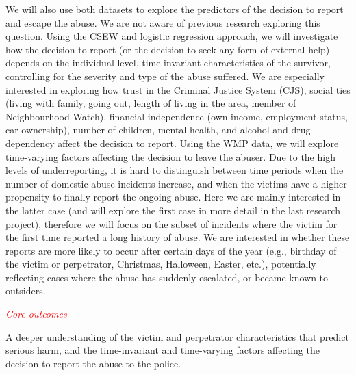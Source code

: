 \documentclass[11pt, a4paper]{article}
\begin{document}
We will also use both datasets to explore the predictors of the decision to report and escape the abuse. We are not aware of previous research exploring this question. Using the CSEW and logistic regression approach, we will investigate how the decision to report (or the decision to seek any form of external help) depends on the individual-level, time-invariant characteristics of the survivor, controlling for the severity and type of the abuse suffered. We are especially interested in exploring how trust in the Criminal Justice System (CJS), social ties (living with family, going out, length of living in the area, member of Neighbourhood Watch), financial independence (own income, employment status, car ownership), number of children, mental health, and alcohol and drug dependency affect the decision to report. Using the WMP data, we will explore time-varying factors affecting the decision to leave the abuser. Due to the high levels of underreporting, it is hard to distinguish between time periods when the number of domestic abuse incidents increase, and when the victims have a higher propensity to finally report the ongoing abuse. Here we are mainly interested in the latter case (and will explore the first case in more detail in the last research project), therefore we will focus on the subset of incidents where the victim for the first time reported a long history of abuse. We are interested in whether these reports are more likely to occur after certain days of the year (e.g., birthday of the victim or perpetrator, Christmas, Halloween, Easter, etc.), potentially reflecting cases where the abuse has suddenly escalated, or became known to outsiders.



\textcolor{red}{\textit{Core outcomes}}

A deeper understanding of the victim and perpetrator characteristics that predict serious harm, and the time-invariant and time-varying factors affecting the decision to report the abuse to the police. 

\FloatBarrier


\end{document}
